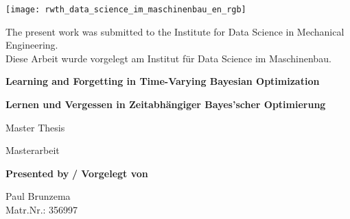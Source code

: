 \begin{titlepage}
    {\vspace*{-4.1cm}\hspace{3.1cm}
    \texttt{[image: rwth\_data\_science\_im\_maschinenbau\_en\_rgb]}}
    
    \noindent The present work was submitted to the Institute for Data Science in Mechanical Engineering.\\
    \textcolor{black!60}{Diese Arbeit wurde vorgelegt am Institut für Data Science im Maschinenbau.}
    
    
    \vspace{4.5cm}

    \Large
    \noindent\textbf{Learning and Forgetting in Time-Varying Bayesian Optimization}

    \noindent\textcolor{black!60}{\textbf{Lernen und Vergessen in Zeitabhängiger Bayes'scher Optimierung}}
    
    \vspace{1.cm}
    
    \noindent Master Thesis

    \noindent\textcolor{black!60}{Masterarbeit}

    \vspace{2.8cm}
    \large
    
    \noindent \textbf{Presented by} \textcolor{black!60}{\textbf{/ Vorgelegt von}}
    
    \vspace{0.4cm}
    \noindent Paul Brunzema\\
    \noindent Matr.Nr.: 356997
    
    \vspace{2.cm}


\end{titlepage}
